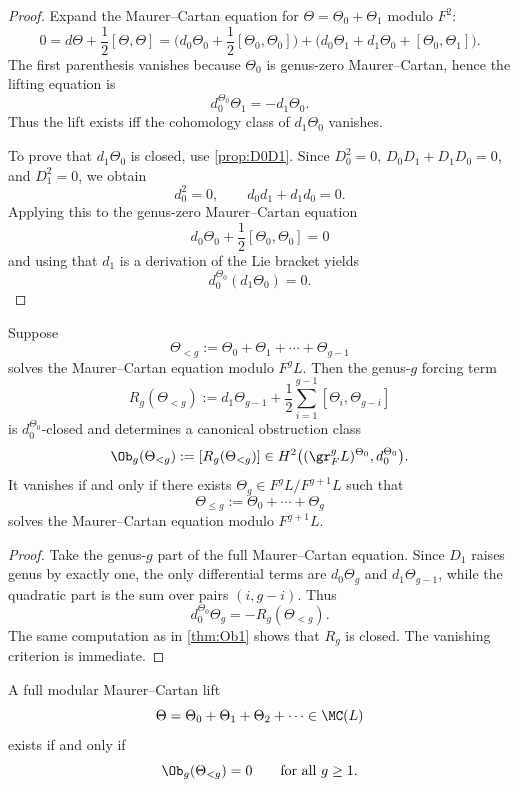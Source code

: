 \begin{proof}
Expand the Maurer--Cartan equation for $\Theta=\Theta_0+\Theta_1$ modulo $F^2$:
\[
0=d\Theta+\frac12[\Theta,\Theta]
=
\Big(d_0\Theta_0+\frac12[\Theta_0,\Theta_0]\Big)
+
\Big(d_0\Theta_1+d_1\Theta_0+[\Theta_0,\Theta_1]\Big).
\]
The first parenthesis vanishes because $\Theta_0$ is genus-zero Maurer--Cartan, hence the
lifting equation is
\[
d_0^{\Theta_0}\Theta_1=-d_1\Theta_0.
\]
Thus the lift exists iff the cohomology class of $d_1\Theta_0$ vanishes.

To prove that $d_1\Theta_0$ is closed, use \cref{prop:D0D1}. Since $D_0^2=0$,
$D_0D_1+D_1D_0=0$, and $D_1^2=0$, we obtain
\[
d_0^2=0,\qquad d_0d_1+d_1d_0=0.
\]
Applying this to the genus-zero Maurer--Cartan equation
\[
d_0\Theta_0+\frac12[\Theta_0,\Theta_0]=0
\]
and using that $d_1$ is a derivation of the Lie bracket yields
\[
d_0^{\Theta_0}(d_1\Theta_0)=0.
\]
\end{proof}

\begin{theorem}\label{thm:Obg}
Suppose
\[
\Theta_{<g}:=\Theta_0+\Theta_1+\cdots+\Theta_{g-1}
\]
solves the Maurer--Cartan equation modulo $F^gL$. Then the genus-$g$ forcing term
\[
R_g(\Theta_{<g})
:=
d_1\Theta_{g-1}
+\frac12\sum_{i=1}^{g-1}[\Theta_i,\Theta_{g-i}]
\]
is $d_0^{\Theta_0}$-closed and determines a canonical obstruction class
\[
\Ob_g(\Theta_{<g})
:=
[R_g(\Theta_{<g})]
\in
H^2\big((\gr_F^gL)^{\Theta_0},d_0^{\Theta_0}\big).
\]
It vanishes if and only if there exists $\Theta_g\in F^gL/F^{g+1}L$ such that
\[
\Theta_{\le g}:=\Theta_0+\cdots+\Theta_g
\]
solves the Maurer--Cartan equation modulo $F^{g+1}L$.
\end{theorem}

\begin{proof}
Take the genus-$g$ part of the full Maurer--Cartan equation. Since $D_1$ raises genus by
exactly one, the only differential terms are $d_0\Theta_g$ and $d_1\Theta_{g-1}$, while the
quadratic part is the sum over pairs $(i,g-i)$. Thus
\[
d_0^{\Theta_0}\Theta_g=-R_g(\Theta_{<g}).
\]
The same computation as in \cref{thm:Ob1} shows that $R_g$ is closed. The vanishing
criterion is immediate.
\end{proof}

\begin{corollary}
A full modular Maurer--Cartan lift
\[
\Theta=\Theta_0+\Theta_1+\Theta_2+\cdots\in \MC(L)
\]
exists if and only if
\[
\Ob_g(\Theta_{<g})=0
\qquad\text{for all }g\ge 1.
\]
\end{corollary}

